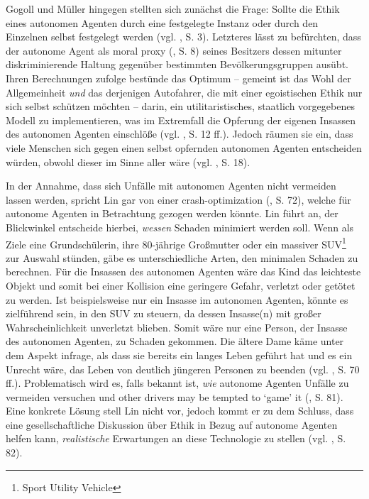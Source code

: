 \documentclass[a4paper, 12pt, titlepage]{scrartcl}
\begin{document}
	Gogoll und M\"uller \autocite{Gogoll2016} hingegen stellten sich zun\"achst die Frage: Sollte die Ethik eines autonomen Agenten durch eine festgelegte Instanz oder durch den Einzelnen selbst festgelegt werden (vgl. \autocite{Gogoll2016}, S. 3). Letzteres l\"asst zu bef\"urchten, dass der autonome Agent als \glqq moral proxy\grqq{} (\autocite{Gogoll2016}, S. 8) seines Besitzers dessen mitunter diskriminierende Haltung gegen\"uber bestimmten Bev\"olkerungsgruppen aus\"ubt. Ihren Berechnungen zufolge best\"unde das Optimum -- gemeint ist das Wohl der Allgemeinheit \emph{und} das derjenigen Autofahrer, die mit einer egoistischen Ethik nur sich selbst sch\"utzen m\"ochten -- darin, ein utilitaristisches, staatlich vorgegebenes Modell zu implementieren, was im Extremfall die Opferung der eigenen Insassen des autonomen Agenten einschl\"o\ss e (vgl. \autocite{Gogoll2016}, S. 12 ff.). Jedoch r\"aumen sie ein, dass viele Menschen sich gegen einen selbst opfernden autonomen Agenten entscheiden w\"urden, obwohl dieser im Sinne aller w\"are (vgl. \autocite{Gogoll2016}, S. 18). 
	
	In der Annahme, dass sich Unf\"alle mit autonomen Agenten nicht vermeiden lassen werden, spricht Lin \autocite{Lin2015} gar von einer \glqq crash-optimization\grqq{} (\autocite{Lin2015}, S. 72), welche f\"ur autonome Agenten in Betrachtung gezogen werden k\"onnte. Lin \autocite{Lin2015} f\"uhrt an, der Blickwinkel entscheide hierbei, \emph{wessen} Schaden minimiert werden soll. Wenn als \glqq Ziele\grqq{} eine Grundsch\"ulerin, ihre 80-j\"ahrige Gro\ss mutter oder ein massiver SUV\footnote{Sport Utility Vehicle} zur Auswahl st\"unden, g\"abe es unterschiedliche Arten, den minimalen Schaden zu berechnen. F\"ur die Insassen des autonomen Agenten w\"are das Kind das leichteste Objekt und somit bei einer Kollision eine geringere Gefahr, verletzt oder get\"otet zu werden. Ist beispielsweise nur ein Insasse im autonomen Agenten, k\"onnte es zielf\"uhrend sein, in den SUV zu steuern, da dessen Insasse(n) mit gro\ss er Wahrscheinlichkeit unverletzt blieben. Somit w\"are nur eine Person, der Insasse des autonomen Agenten, zu Schaden gekommen. Die \"altere Dame k\"ame unter dem Aspekt infrage, als dass sie bereits ein langes Leben gef\"uhrt hat und es ein Unrecht w\"are, das Leben von deutlich j\"ungeren Personen zu beenden (vgl. \autocite{Lin2015}, S. 70 ff.). Problematisch wird es, falls bekannt ist, \emph{wie} autonome Agenten Unf\"alle zu vermeiden versuchen und \glqq other drivers may be tempted to `game' it\grqq{} (\autocite{Lin2015}, S. 81). Eine konkrete L\"osung stell Lin \autocite{Lin2015} nicht vor, jedoch kommt er zu dem Schluss, dass eine gesellschaftliche Diskussion \"uber Ethik in Bezug auf autonome Agenten helfen kann, \emph{realistische} Erwartungen an diese Technologie zu stellen (vgl. \autocite{Lin2015}, S. 82).
	
\end{document}
